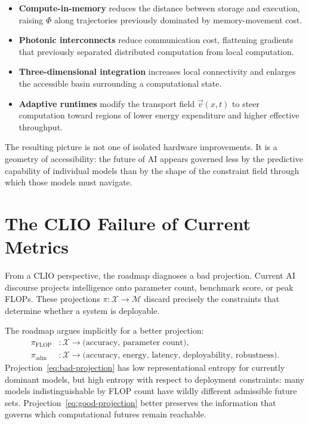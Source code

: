 \documentclass[11pt, a4paper, openany]{book}
\theoremstyle{plain}
\theoremstyle{definition}
\theoremstyle{remark}
\begin{document}
\begin{itemize}
  \item \textbf{Compute-in-memory} reduces the distance between storage
    and execution, raising $\Phi$ along trajectories previously dominated
    by memory-movement cost.
  \item \textbf{Photonic interconnects} reduce communication cost,
    flattening gradients that previously separated distributed computation
    from local computation.
  \item \textbf{Three-dimensional integration} increases local connectivity
    and enlarges the accessible basin surrounding a computational state.
  \item \textbf{Adaptive runtimes} modify the transport field $\vec{v}(x,t)$
    to steer computation toward regions of lower energy expenditure and
    higher effective throughput.
\end{itemize}

The resulting picture is not one of isolated hardware improvements.
It is a geometry of accessibility: the future of AI appears governed
less by the predictive capability of individual models than by the shape
of the constraint field through which those models must navigate.

\section{The CLIO Failure of Current Metrics}

From a CLIO perspective, the roadmap diagnoses a bad projection.
Current AI discourse projects intelligence onto parameter count,
benchmark score, or peak FLOPs.
These projections $\pi : \mathcal{X} \to \mathcal{M}$ discard precisely
the constraints that determine whether a system is deployable.

The roadmap argues implicitly for a better projection:
\begin{align}
  \pi_{\mathrm{FLOP}} &: \mathcal{X} \to \text{(accuracy, parameter count)},
  \label{eq:bad-projection} \\
  \pi_{\mathrm{adm}} &: \mathcal{X} \to \text{(accuracy, energy, latency,
    deployability, robustness)}.
  \label{eq:good-projection}
\end{align}
Projection~\eqref{eq:bad-projection} has low representational entropy for
currently dominant models, but high entropy with respect to deployment
constraints: many models indistinguishable by FLOP count have wildly
different admissible future sets.
Projection~\eqref{eq:good-projection} better preserves the information that
governs which computational futures remain reachable.
\end{document}
